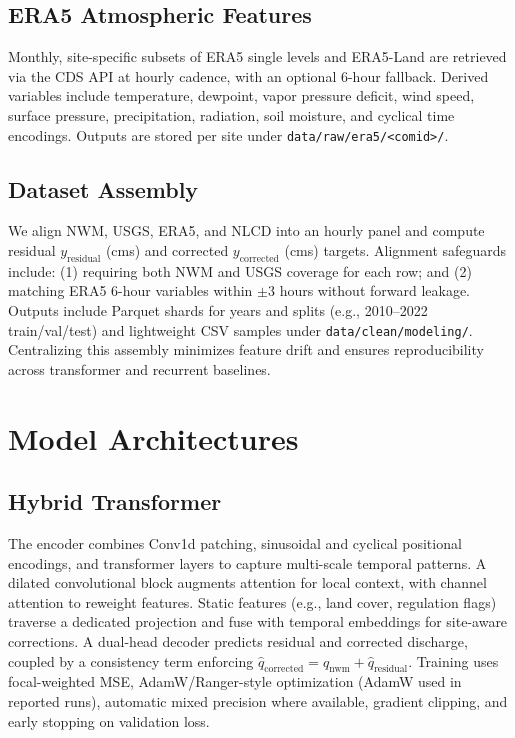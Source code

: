 \documentclass[draft]{agujournal2019}
\begin{document}
\subsection{ERA5 Atmospheric Features}
Monthly, site-specific subsets of ERA5 single levels and ERA5-Land are retrieved via the CDS API at hourly cadence, with an optional 6-hour fallback. Derived variables include temperature, dewpoint, vapor pressure deficit, wind speed, surface pressure, precipitation, radiation, soil moisture, and cyclical time encodings. Outputs are stored per site under \texttt{data/raw/era5/\textless comid\textgreater/}.

\subsection{Dataset Assembly}
We align NWM, USGS, ERA5, and NLCD into an hourly panel and compute residual $y_{\mathrm{residual}}$ (cms) and corrected $y_{\mathrm{corrected}}$ (cms) targets. Alignment safeguards include: (1) requiring both NWM and USGS coverage for each row; and (2) matching ERA5 6-hour variables within $\pm 3$ hours without forward leakage. Outputs include Parquet shards for years and splits (e.g., 2010--2022 train/val/test) and lightweight CSV samples under \texttt{data/clean/modeling/}. Centralizing this assembly minimizes feature drift and ensures reproducibility across transformer and recurrent baselines.

\section{Model Architectures}
\subsection{Hybrid Transformer}
The encoder combines Conv1d patching, sinusoidal and cyclical positional encodings, and transformer layers to capture multi-scale temporal patterns. A dilated convolutional block augments attention for local context, with channel attention to reweight features. Static features (e.g., land cover, regulation flags) traverse a dedicated projection and fuse with temporal embeddings for site-aware corrections. A dual-head decoder predicts residual and corrected discharge, coupled by a consistency term enforcing \(\hat{q}_{\mathrm{corrected}} = q_{\mathrm{nwm}} + \hat{q}_{\mathrm{residual}}\). Training uses focal-weighted MSE, AdamW/Ranger-style optimization (AdamW used in reported runs), automatic mixed precision where available, gradient clipping, and early stopping on validation loss.
\end{document}
